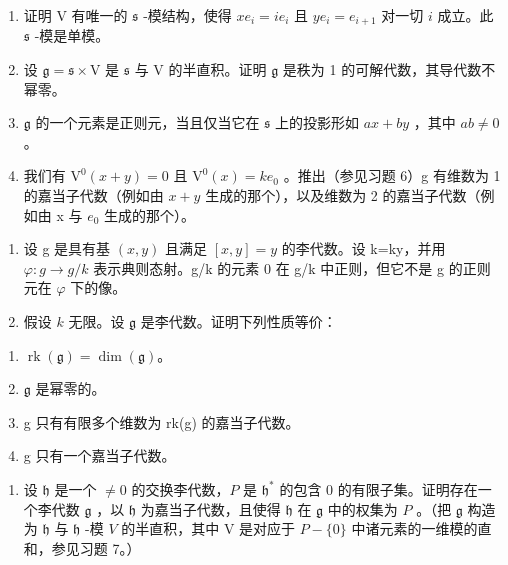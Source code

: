 \begin{enumerate}
\def\labelenumi{\alph{enumi})}
\item
  证明 V 有唯一的 \(\mathfrak{s}\) -模结构，使得 \(xe_{i} = ie_{i}\) 且 \(ye_{i} = e_{i + 1}\) 对一切 \(i\) 成立。此 \(\mathfrak{s}\) -模是单模。
\item
  设 \(\mathfrak{g} = \mathfrak{s} \times \mathrm{V}\) 是 \(\mathfrak{s}\) 与 \(\mathrm{V}\) 的半直积。证明 \(\mathfrak{g}\) 是秩为 1 的可解代数，其导代数不幂零。
\item
  \(\mathfrak{g}\) 的一个元素是正则元，当且仅当它在 \(\mathfrak{s}\) 上的投影形如 \(ax + by\) ，其中 \(ab \neq 0\) 。
\item
  我们有 \(\mathrm{V}^{0}(x+y)=0\) 且 \(\mathrm{V}^{0}(x)=ke_{0}\) 。推出（参见习题 6）g 有维数为 1 的嘉当子代数（例如由 \(x+y\) 生成的那个），以及维数为 2 的嘉当子代数（例如由 x 与 \(e_{0}\) 生成的那个）。
\end{enumerate}

\begin{enumerate}
\def\labelenumi{\arabic{enumi})}
\setcounter{enumi}{8}
\item
  设 g 是具有基 \((x,y)\) 且满足 \([x,y]=y\) 的李代数。设 k=ky，并用 \(\varphi:g\to g/k\) 表示典则态射。g/k 的元素 0 在 g/k 中正则，但它不是 g 的正则元在 \(\varphi\) 下的像。
\item
  假设 \(k\) 无限。设 \(\mathfrak{g}\) 是李代数。证明下列性质等价：
\end{enumerate}

\begin{enumerate}
\def\labelenumi{(\roman{enumi})}
\item
  \(\operatorname{rk}(\mathfrak{g}) = \dim (\mathfrak{g})\)。
\item
  \(\mathfrak{g}\) 是幂零的。
\item
  g 只有有限多个维数为 rk(g) 的嘉当子代数。
\item
  g 只有一个嘉当子代数。
\end{enumerate}

\begin{enumerate}
\def\labelenumi{\arabic{enumi})}
\setcounter{enumi}{10}
\tightlist
\item
  设 \(\mathfrak{h}\) 是一个 \(\neq 0\) 的交换李代数，\(P\) 是 \(\mathfrak{h}^*\) 的包含 0 的有限子集。证明存在一个李代数 \(\mathfrak{g}\) ，以 \(\mathfrak{h}\) 为嘉当子代数，且使得 \(\mathfrak{h}\) 在 \(\mathfrak{g}\) 中的权集为 \(P\) 。（把 \(\mathfrak{g}\) 构造为 \(\mathfrak{h}\) 与 \(\mathfrak{h}\) -模 \(V\) 的半直积，其中 V 是对应于 \(P - \{0\}\) 中诸元素的一维模的直和，参见习题 7。）
\end{enumerate}

